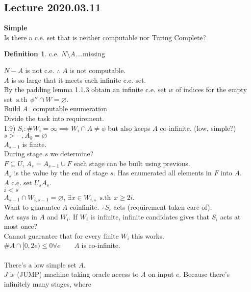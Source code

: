 \documentclass{article}
\newcommand{\sth}{\ \mathrm{s.th}\ }
\renewcommand{\emptyset}{\varnothing}
\theoremstyle{definition}
\newtheorem{definition}[theorem]{Definition}
\theoremstyle{remark}
\theoremstyle{example}
\begin{document}
	\subsection*{Lecture 2020.03.11}
	\textbf{Simple}\\
	Is there a c.e. set that is neither computable nor Turing Complete?\\
	\begin{definition}
		c.e. $N \setminus A$....missing
	\end{definition}
	$N-A$ is not c.e. $\therefore$ $A$ is not computable.\\
	$A$ is so large that it meets each infinite c.e. set.\\
	By the padding lemma 1.1.3 obtain an infinite c.e. set $w$ of indices for the empty set $\sth\ \phi'' \cap W = \emptyset$.\\
	Build $A$=computable enumeration\\
	Divide the task into requirement.\\
	1.9) $S_i : \# W_i = \infty \implies W_i \cap A \neq \phi$ but also keeps $A$ co-infinite. (low, simple?)\\
	$s > -, A_0 = \emptyset$\\
	$A_{s-1}$ is finite.\\
	During stage $s$ we determine?\\
	$F \subseteq U$, $A_s=A_{s-1}\cup F$ each stage can be built using previous.\\
	$A_s$ is the value by the end of stage $s$. Has enumerated all elements in $F$ into $A$.\\
	$A$ c.e. set $U_sA_s$.\\
	$i < s$\\
	$A_{s-1} \cap W_{i,s-1}=\emptyset$, $\exists x \in W_{i,s}\ \sth\ x \geq 2i$.\\
	Want to guarantee $A$ coinfinite. $\therefore S_i$ acts (requirement taken care of).\\
	Act says in $A$ and $W_i$.
	If $W_i$ is infinite, infinite candidates gives that $S_i$ acts at most once?\\
	Cannot guarantee that for every finite $W_i$ this works.\\
	$\#A \cap [0,2e) \leq 0 \forall e\qquad A$ is co-infinite.\\\\
	There's a low simple set $A$.\\
	$J$ is (JUMP) machine taking oracle access to $A$ on input $e$. Because there's infinitely many stages, where\\
\end{document}
